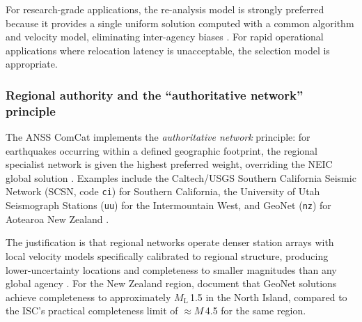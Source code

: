 \documentclass[12pt]{article}
\begin{document}
For research-grade applications, the re-analysis model is strongly preferred
because it provides a single uniform solution computed with a common algorithm
and velocity model, eliminating inter-agency biases \citep{Storchak2013}.  For
rapid operational applications where relocation latency is unacceptable, the
selection model is appropriate.

\subsubsection{Regional authority and the ``authoritative network'' principle}

The ANSS ComCat implements the \emph{authoritative network} principle: for
earthquakes occurring within a defined geographic footprint, the regional
specialist network is given the highest preferred weight, overriding the NEIC
global solution \citep{usgs_comcat}.  Examples include the Caltech/USGS Southern
California Seismic Network (SCSN, code \texttt{ci}) for Southern California,
the University of Utah Seismograph Stations (\texttt{uu}) for the Intermountain
West, and GeoNet (\texttt{nz}) for Aotearoa New Zealand \citep{GeoNetEqCatalogue}.

The justification is that regional networks operate denser station arrays with
local velocity models specifically calibrated to regional structure, producing
lower-uncertainty locations and completeness to smaller magnitudes than any
global agency \citep{Woessner2005, Hutton2010}.  For the New Zealand region,
\citet{GeoNetEqCatalogue} document that GeoNet solutions achieve completeness to
approximately $M_\mathrm{L}$\,1.5 in the North Island, compared to the ISC's
practical completeness limit of $\approx M$\,4.5 for the same region.
\end{document}
